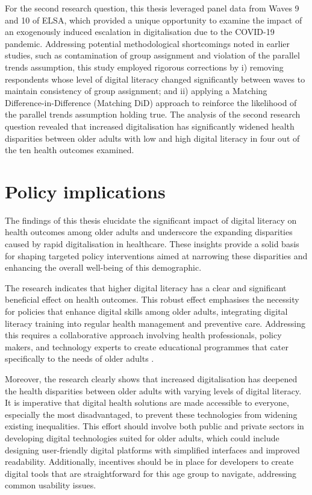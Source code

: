 For the second research question, this thesis leveraged panel data from Waves 9 and 10 of ELSA, which provided a unique opportunity to examine the impact of an exogenously induced escalation in digitalisation due to the COVID-19 pandemic. Addressing potential methodological shortcomings noted in earlier studies, such as contamination of group assignment and violation of the parallel trends assumption, this study employed rigorous corrections by i) removing respondents whose level of digital literacy changed significantly between waves to maintain consistency of group assignment; and ii) applying a Matching Difference-in-Difference (Matching DiD) approach to reinforce the likelihood of the parallel trends assumption holding true. The analysis of the second research question revealed that increased digitalisation has significantly widened health disparities between older adults with low and high digital literacy in four out of the ten health outcomes examined. 

\section{Policy implications}
The findings of this thesis elucidate the significant impact of digital literacy on health outcomes among older adults and underscore the expanding disparities caused by rapid digitalisation in healthcare. These insights provide a solid basis for shaping targeted policy interventions aimed at narrowing these disparities and enhancing the overall well-being of this demographic.

The research indicates that higher digital literacy has a clear and significant beneficial effect on health outcomes. This robust effect emphasises the necessity for policies that enhance digital skills among older adults, integrating digital literacy training into regular health management and preventive care. Addressing this requires a collaborative approach involving health professionals, policy makers, and technology experts to create educational programmes that cater specifically to the needs of older adults \parencite{eyrich_bridging_2021}.

Moreover, the research clearly shows that increased digitalisation has deepened the health disparities between older adults with varying levels of digital literacy. It is imperative that digital health solutions are made accessible to everyone, especially the most disadvantaged, to prevent these technologies from widening existing inequalities. This effort should involve both public and private sectors in developing digital technologies suited for older adults, which could include designing user-friendly digital platforms with simplified interfaces and improved readability. Additionally, incentives should be in place for developers to create digital tools that are straightforward for this age group to navigate, addressing common usability issues.

